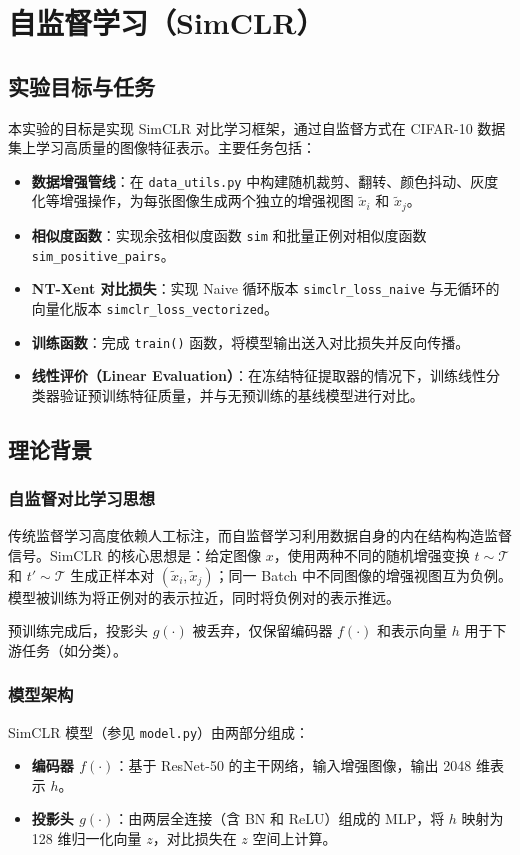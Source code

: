 
\chapter{自监督学习（SimCLR）}

\section{实验目标与任务}
本实验的目标是实现 SimCLR 对比学习框架，通过自监督方式在 CIFAR-10 数据集上学习高质量的图像特征表示。主要任务包括：
\begin{itemize}
    \item \textbf{数据增强管线}：在 \texttt{data\_utils.py} 中构建随机裁剪、翻转、颜色抖动、灰度化等增强操作，为每张图像生成两个独立的增强视图 $\tilde{x}_i$ 和 $\tilde{x}_j$。
    \item \textbf{相似度函数}：实现余弦相似度函数 \texttt{sim} 和批量正例对相似度函数 \texttt{sim\_positive\_pairs}。
    \item \textbf{NT-Xent 对比损失}：实现 Naive 循环版本 \texttt{simclr\_loss\_naive} 与无循环的向量化版本 \texttt{simclr\_loss\_vectorized}。
    \item \textbf{训练函数}：完成 \texttt{train()} 函数，将模型输出送入对比损失并反向传播。
    \item \textbf{线性评价（Linear Evaluation）}：在冻结特征提取器的情况下，训练线性分类器验证预训练特征质量，并与无预训练的基线模型进行对比。
\end{itemize}

\section{理论背景}

\subsection{自监督对比学习思想}
传统监督学习高度依赖人工标注，而自监督学习利用数据自身的内在结构构造监督信号。SimCLR 的核心思想是：给定图像 $x$，使用两种不同的随机增强变换 $t \sim \mathcal{T}$ 和 $t' \sim \mathcal{T}$ 生成正样本对 $(\tilde{x}_i, \tilde{x}_j)$；同一 Batch 中不同图像的增强视图互为负例。模型被训练为将正例对的表示拉近，同时将负例对的表示推远。

预训练完成后，投影头 $g(\cdot)$ 被丢弃，仅保留编码器 $f(\cdot)$ 和表示向量 $h$ 用于下游任务（如分类）。

\subsection{模型架构}
SimCLR 模型（参见 \texttt{model.py}）由两部分组成：
\begin{itemize}
    \item \textbf{编码器 $f(\cdot)$}：基于 ResNet-50 的主干网络，输入增强图像，输出 2048 维表示 $h$。
    \item \textbf{投影头 $g(\cdot)$}：由两层全连接（含 BN 和 ReLU）组成的 MLP，将 $h$ 映射为 128 维归一化向量 $z$，对比损失在 $z$ 空间上计算。
\end{itemize}

